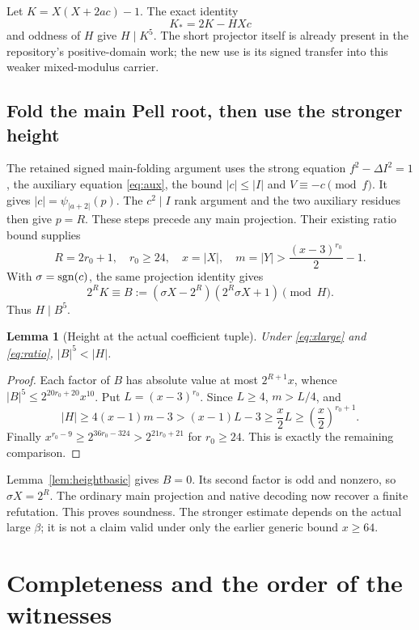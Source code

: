 \documentclass[11pt]{article}
\newtheorem{lemma}[theorem]{Lemma}\newtheorem{proposition}[theorem]{Proposition}
\theoremstyle{definition}\newtheorem{definition}[theorem]{Definition}
\theoremstyle{remark}\newtheorem{remark}[theorem]{Remark}
\begin{document}
Let $K=X(X+2ac)-1$. The exact identity
\begin{equation}\label{eq:shortprojection}
 K_*=2K-HXc
\end{equation}
and oddness of $H$ give $H\mid K^5$. The short projector itself is
already present in the repository's positive-domain work; the new use
is its signed transfer into this weaker mixed-modulus carrier.

\subsection{Fold the main Pell root, then use the stronger height}
The retained signed main-folding argument uses the strong equation
$f^2-\Delta I^2=1$, the auxiliary equation \eqref{eq:aux}, the bound
$|c|\le|I|$ and $V\equiv-c\pmod f$. It gives
$|c|=\psi_{|a+2|}(p)$. The $c^2\mid I$ rank argument and the two
auxiliary residues then give $p=R$. These steps precede any main
projection. Their existing ratio bound supplies
\begin{equation}\label{eq:ratio}
 R=2r_0+1,\quad r_0\ge24,\quad x=|X|,\quad
 m=|Y|>\frac{(x-3)^{r_0}}2-1.
\end{equation}
With $\sigma=\operatorname{sgn}(c)$, the same projection identity gives
\[
 2^R K\equiv
 B:=(\sigma X-2^R)(2^R\sigma X+1)\pmod H.
\]
Thus $H\mid B^5$.

\begin{lemma}[Height at the actual coefficient tuple]\label{lem:height}
Under \eqref{eq:xlarge} and \eqref{eq:ratio}, $|B|^5<|H|$.
\end{lemma}
\begin{proof}
Each factor of $B$ has absolute value at most $2^{R+1}x$, whence
$|B|^5\le2^{20r_0+20}x^{10}$. Put $L=(x-3)^{r_0}$. Since $L\ge4$,
$m>L/4$, and
\[
 |H|\ge4(x-1)m-3>(x-1)L-3
 \ge\frac x2L\ge\left(\frac x2\right)^{r_0+1}.
\]
Finally
$x^{r_0-9}\ge2^{36r_0-324}>2^{21r_0+21}$ for $r_0\ge24$.
This is exactly the remaining comparison.
\end{proof}
Lemma~\ref{lem:heightbasic} gives $B=0$. Its second factor is odd and
nonzero, so $\sigma X=2^R$. The ordinary main projection and native
decoding now recover a finite refutation. This proves soundness. The
stronger estimate depends on the actual large $\beta$; it is not a
claim valid under only the earlier generic bound $x\ge64$.

\section{Completeness and the order of the witnesses}
\end{document}
